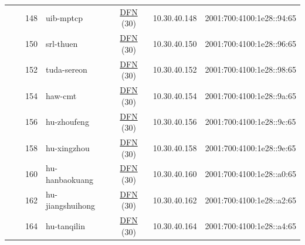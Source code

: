 \begin{small}
\begin{center}
\begin{longtable}{|c|c|c|c|c|c|c|c|}
  &  & \tiny{148} & \multicolumn{1}{|l|}{\tiny{uib-mptcp}} & \multicolumn{2}{|c|}{\tiny{\href{https://www.dfn.de}{DFN} (30)}} & \tiny{10.30.40.148} & \tiny{2001:700:4100:1e28::94:65} \\* \cline{3-3}\cline{4-4}\cline{5-5}\cline{6-6}\cline{7-7}\cline{8-8}
  &  & \tiny{150} & \multicolumn{1}{|l|}{\tiny{srl-thuen}} & \multicolumn{2}{|c|}{\tiny{\href{https://www.dfn.de}{DFN} (30)}} & \tiny{10.30.40.150} & \tiny{2001:700:4100:1e28::96:65} \\* \cline{3-3}\cline{4-4}\cline{5-5}\cline{6-6}\cline{7-7}\cline{8-8}
  &  & \tiny{152} & \multicolumn{1}{|l|}{\tiny{tuda-sereon}} & \multicolumn{2}{|c|}{\tiny{\href{https://www.dfn.de}{DFN} (30)}} & \tiny{10.30.40.152} & \tiny{2001:700:4100:1e28::98:65} \\* \cline{3-3}\cline{4-4}\cline{5-5}\cline{6-6}\cline{7-7}\cline{8-8}
  &  & \tiny{154} & \multicolumn{1}{|l|}{\tiny{haw-cmt}} & \multicolumn{2}{|c|}{\tiny{\href{https://www.dfn.de}{DFN} (30)}} & \tiny{10.30.40.154} & \tiny{2001:700:4100:1e28::9a:65} \\* \cline{3-3}\cline{4-4}\cline{5-5}\cline{6-6}\cline{7-7}\cline{8-8}
  &  & \tiny{156} & \multicolumn{1}{|l|}{\tiny{hu-zhoufeng}} & \multicolumn{2}{|c|}{\tiny{\href{https://www.dfn.de}{DFN} (30)}} & \tiny{10.30.40.156} & \tiny{2001:700:4100:1e28::9c:65} \\* \cline{3-3}\cline{4-4}\cline{5-5}\cline{6-6}\cline{7-7}\cline{8-8}
  &  & \tiny{158} & \multicolumn{1}{|l|}{\tiny{hu-xingzhou}} & \multicolumn{2}{|c|}{\tiny{\href{https://www.dfn.de}{DFN} (30)}} & \tiny{10.30.40.158} & \tiny{2001:700:4100:1e28::9e:65} \\* \cline{3-3}\cline{4-4}\cline{5-5}\cline{6-6}\cline{7-7}\cline{8-8}
  &  & \tiny{160} & \multicolumn{1}{|l|}{\tiny{hu-hanbaokuang}} & \multicolumn{2}{|c|}{\tiny{\href{https://www.dfn.de}{DFN} (30)}} & \tiny{10.30.40.160} & \tiny{2001:700:4100:1e28::a0:65} \\* \cline{3-3}\cline{4-4}\cline{5-5}\cline{6-6}\cline{7-7}\cline{8-8}
  &  & \tiny{162} & \multicolumn{1}{|l|}{\tiny{hu-jiangshuihong}} & \multicolumn{2}{|c|}{\tiny{\href{https://www.dfn.de}{DFN} (30)}} & \tiny{10.30.40.162} & \tiny{2001:700:4100:1e28::a2:65} \\* \cline{3-3}\cline{4-4}\cline{5-5}\cline{6-6}\cline{7-7}\cline{8-8}
  &  & \tiny{164} & \multicolumn{1}{|l|}{\tiny{hu-tanqilin}} & \multicolumn{2}{|c|}{\tiny{\href{https://www.dfn.de}{DFN} (30)}} & \tiny{10.30.40.164} & \tiny{2001:700:4100:1e28::a4:65} \\* \cline{3-3}\cline{4-4}\cline{5-5}\cline{6-6}\cline{7-7}\cline{8-8}

\end{longtable}
\end{center}
\end{small}
